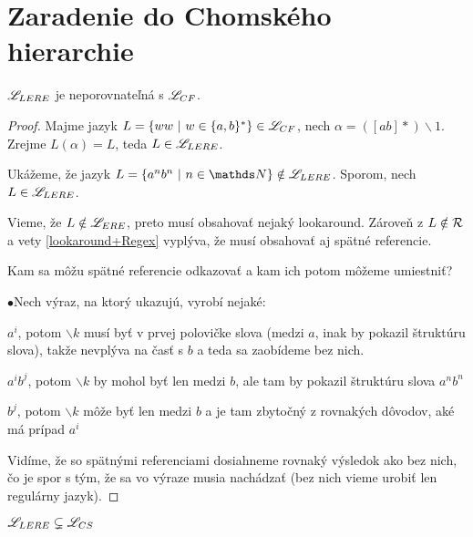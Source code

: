 \section[Chomského hierarchia]{Zaradenie do Chomského hierarchie}

\begin{veta}\label{lelcf}
$\mathscr{L}_{LERE}$ je neporovnateľná s $ \mathscr{L}_{CF}$.
\end{veta}
\begin{proof}
Majme jazyk $L=\lbrace ww~|~w \in \lbrace a,b \rbrace^* \rbrace \in \mathscr{L}_{CF}$, nech $ \alpha = ([ab]*)\backslash 1 $.
Zrejme $ L(\alpha) = L $, teda $L\in \mathscr{L}_{LERE}$.

Ukážeme, že jazyk $L=\lbrace a^nb^n~|~n \in \N \rbrace \notin \lel$. Sporom, nech $L \in \mathscr{L}_{LERE}$. 

Vieme, že $L \notin \mathscr{L}_{ERE}$, preto musí obsahovať nejaký lookaround. Zároveň z $L \notin {\cal R}$ a vety \ref{lookaround+Regex} vyplýva, že musí obsahovať aj spätné referencie.

Kam sa môžu spätné referencie odkazovať a kam ich potom môžeme umiestniť?
\begin{list}{$\bullet$}{Nech výraz, na ktorý ukazujú, vyrobí nejaké:}
\item $a^i$, potom $\backslash k$ musí byť v prvej polovičke slova (medzi $a$, inak by pokazil štruktúru slova), takže nevplýva na časť s $b$ a teda sa zaobídeme bez nich.
\item $a^ib^j$, potom $\backslash k$ by mohol byť len medzi $b$, ale tam by pokazil štruktúru slova $a^nb^n$
\item $b^j$, potom $\backslash k$ môže byť len medzi $b$ a je tam zbytočný z rovnakých dôvodov, aké má prípad $a^i$
\end{list}
Vidíme, že so spätnými referenciami dosiahneme rovnaký výsledok ako bez nich, čo je spor s tým, že sa vo výraze musia nachádzať (bez nich vieme urobiť len regulárny jazyk).
\end{proof}

\begin{dosledok}
$\mathscr{L}_{LERE} \subsetneq \mathscr{L}_{CS}$
\end{dosledok}

